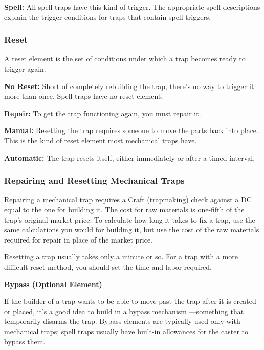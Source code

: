 \documentclass{article}
\begin{document}
\textbf{Spell:} All spell traps have this kind of trigger. The appropriate spell 
descriptions\textit{ }explain the trigger conditions for traps that contain spell 
triggers.

\vspace{12pt}
\subsubsection*{\textbf{Reset}}

A reset element is the set of conditions under which a trap becomes ready to trigger 
again.

\textbf{No Reset: }Short of completely rebuilding the trap, there's no way to trigger 
it more than once. Spell traps have no reset element. 

\textbf{Repair:} To get the trap functioning again, you must repair it. 

\textbf{Manual: }Resetting the trap requires someone to move the parts back into 
place. This is the kind of reset element most mechanical traps have.

\textbf{Automatic:} The trap resets itself, either immediately or after a timed 
interval.

\vspace{12pt}
\subsubsection*{\textbf{Repairing and Resetting Mechanical Traps}}

Repairing a mechanical trap requires a Craft (trapmaking) check against a DC equal 
to the one for building it. The cost for raw materials is one-fifth of the trap's 
original market price. To calculate how long it takes to fix a trap, use the same 
calculations you would for building it, but use the cost of the raw materials required 
for repair in place of the market price.

Resetting a trap usually takes only a minute or so. For a trap with a more difficult 
reset method, you should set the time and labor required.

\vspace{12pt}
\textbf{Bypass (Optional Element)}

If the builder of a trap wants to be able to move past the trap after it is created 
or placed, it's a good idea to build in a bypass mechanism ---something that temporarily 
disarms the trap. Bypass elements are typically used only with mechanical traps; 
spell traps usually have built-in allowances for the caster to bypass them.
\end{document}
